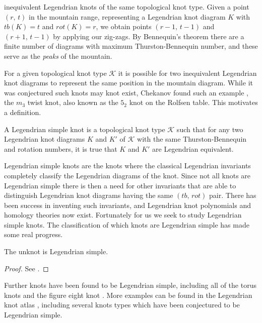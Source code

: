     inequivalent Legendrian knots of the same topological knot type. Given
    a point $(r,\,t)$ in the mountain range, representing a Legendrian knot
    diagram $K$ with $tb(K)=t$ and $rot(K)=r$, we obtain points
    $(r-1,\,t-1)$ and $(r+1,\,t-1)$ by applying our zig-zags. By
    Bennequin's theorem there are a finite number of diagrams with
    maximum Thurston-Bennequin number, and these serve as the
    \textit{peaks} of the mountain.
    \par\hfill\par
    For a given topological knot type $\mathcal{K}$ it is possible for two
    inequivalent Legendrian knot diagrams to represent the same position in
    the mountain diagram. While it was conjectured such knots may knot exist,
    Chekanov found such an example \cite{ChekanovDifAlgOfLegLinks},
    the $m_{3}$ twist knot, also known as the $5_{2}$ knot on the Rolfsen
    table. This motivates a definition.
    \begin{definition}
        A Legendrian simple knot is a topological knot type $\mathcal{K}$
        such that for any two Legendrian knot diagrams $K$ and $K'$ of
        $\mathcal{K}$ with the same Thurston-Bennequin and rotation numbers,
        it is true that $K$ and $K'$ are Legendrian equivalent.
    \end{definition}
    Legendrian simple knots are the knots where the classical Legendrian
    invariants completely classify the Legendrian diagrams of the knot. Since
    not all knots are Legendrian simple there is then a need for other
    invariants that are able to distinguish Legendrian knot diagrams having
    the same $(tb,\,rot)$ pair. There has been success in inventing such
    invariants, and Legendrian knot polynomials and homology theories now
    exist. Fortunately for us we seek to study Legendrian simple knots. The
    classification of which knots are Legendrian simple has made some real
    progress.
    \begin{theorem}
        The unknot is Legendrian simple.
    \end{theorem}
    \begin{proof}
        See \cite{EliashbergFraserClassificationTopTrivialLegKnots}.
    \end{proof}
    Further knots have been found to be Legendrian simple, including all of the
    torus knots and the figure eight knot \cite{EtnyreHondaContactTopologyI}.
    More examples can be found in the Legendrian knot atlas
    \cite{LegendrianKnotAtlas}, including several knots types which have been
    conjectured to be Legendrian simple.
